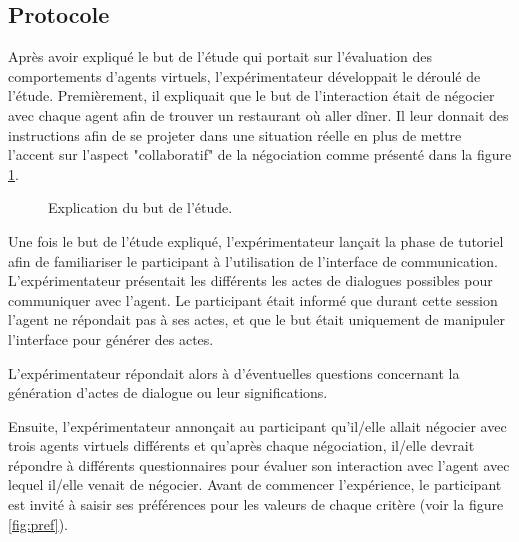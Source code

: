 \subsection{Protocole}
Après avoir expliqué le but de l'étude qui portait sur l'évaluation des comportements d'agents virtuels, l'expérimentateur développait le déroulé de l'étude. 
Premièrement, il expliquait que le but de l'interaction était de négocier avec chaque agent afin de trouver un restaurant où aller dîner. Il leur donnait des instructions afin de se projeter dans une situation réelle en plus de mettre l'accent sur l'aspect "collaboratif" de la négociation comme présenté dans la figure \ref{fig:instruction}.

\begin{figure}[h]
		
		\caption{\label{fig:instruction}Explication du but de l'étude.}
	\end{figure}
	
	
	Une fois le but de l'étude expliqué, l'expérimentateur lançait la phase de tutoriel afin de familiariser le participant à l'utilisation de l'interface de communication. L'expérimentateur présentait les différents les actes de dialogues possibles pour communiquer avec l'agent. 	
	Le participant était informé que durant cette session l'agent ne répondait pas à ses actes, et que le but était uniquement de manipuler l'interface pour générer des actes. 
	
	L’expérimentateur répondait alors à d’éventuelles questions concernant la génération d'actes de dialogue ou leur significations.
	
	Ensuite, l’expérimentateur annonçait au participant qu’il/elle allait négocier avec trois  agents virtuels différents et
	qu’après chaque négociation, il/elle devrait répondre à différents questionnaires pour évaluer son interaction avec l’agent avec lequel il/elle venait de négocier.  Avant de commencer l'expérience, le participant est invité à saisir ses préférences pour les valeurs de chaque critère (voir la figure \ref{fig:pref}).
	

